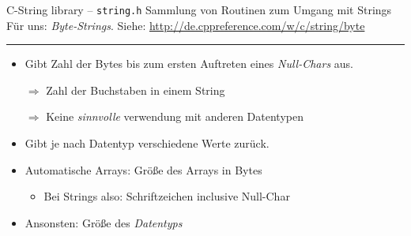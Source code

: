 \begin{frame}[fragile]{C-String library -- \texttt{string.h}}
%
%
Sammlung von Routinen zum Umgang mit Strings\newline
Für uns: \emph{Byte-Strings}. Siehe: \url{http://de.cppreference.com/w/c/string/byte}
\begin{center}		%
\hrule				%
\end{center}
%
\begin{tcolorbox}[title=\texttt{strlen}, height=4.7cm]
\begin{itemize}
\item Gibt Zahl der Bytes bis zum ersten Auftreten eines \emph{Null-Chars} aus.
\item[$\Rightarrow$] Zahl der Buchstaben in einem String
\item[$\Rightarrow$] Keine \emph{sinnvolle} verwendung mit anderen Datentypen
\end{itemize}
\end{tcolorbox}
%
\begin{tcolorbox}[title=\texttt{sizeof}, height=4.7cm]
\begin{itemize}
\item Gibt je nach Datentyp verschiedene Werte zurück.
\item Automatische Arrays: Größe des Arrays in Bytes
	\begin{itemize}
	\item Bei Strings also: Schriftzeichen inclusive Null-Char
	\end{itemize}
\item Ansonsten: Größe des \emph{Datentyps}
\end{itemize}
\end{tcolorbox}
%
\end{frame}


